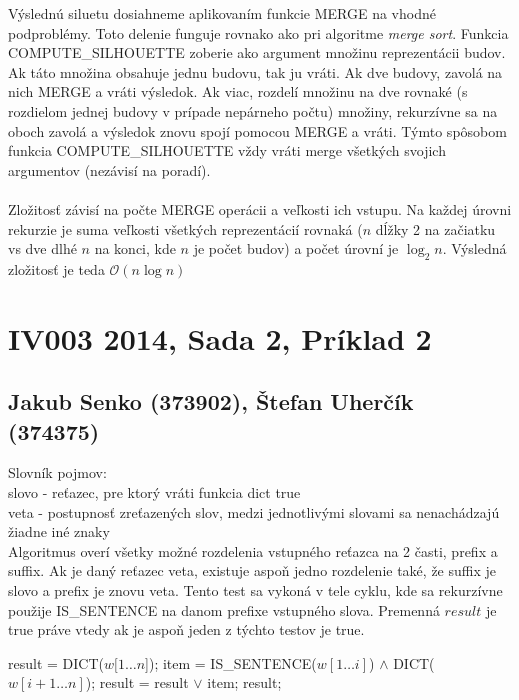 \documentclass[paper=a4, fontsize=11pt]{scrartcl} %
\numberwithin{equation}{section} %
\numberwithin{figure}{section} %
\numberwithin{table}{section} %
\begin{document}
Výslednú siluetu dosiahneme aplikovaním funkcie MERGE na vhodné podproblémy. Toto delenie funguje rovnako ako pri algoritme {\em merge sort}. Funkcia COMPUTE\_SILHOUETTE zoberie ako argument množinu reprezentácii budov. Ak táto množina obsahuje jednu budovu, tak ju vráti. Ak dve budovy, zavolá na nich MERGE a vráti výsledok. Ak viac, rozdelí množinu na dve rovnaké (s rozdielom jednej budovy v prípade nepárneho počtu) množiny, rekurzívne sa na oboch zavolá a výsledok znovu spojí pomocou MERGE a vráti. Týmto spôsobom funkcia COMPUTE\_SILHOUETTE vždy vráti merge všetkých svojich argumentov (nezávisí na poradí). \\
\\
Zložitosť závisí na počte MERGE operácii a veľkosti ich vstupu. Na každej úrovni rekurzie je suma veľkosti všetkých reprezentácií rovnaká ($n$ dĺžky 2 na začiatku vs dve dlhé $n$ na konci, kde $n$ je počet budov) a počet úrovní je $\log_2 n$. Výsledná zložitosť je teda $\mathcal{O}(n \log n)$

\pagebreak


\section*{IV003 2014, Sada 2, Príklad 2}
\subsection*{Jakub Senko (373902), Štefan Uherčík (374375)}

Slovník pojmov: \ \\
slovo - reťazec, pre ktorý vráti funkcia dict true \ \\
veta - postupnosť zreťazených slov, medzi jednotlivými slovami sa nenachádzajú žiadne iné znaky \ \\

Algoritmus overí všetky možné rozdelenia vstupného reťazca na 2 časti, prefix a suffix.
Ak je daný reťazec veta, existuje aspoň jedno rozdelenie také, že suffix je slovo a prefix je znovu veta.
Tento test sa vykoná v tele cyklu, kde sa rekurzívne použije IS\_SENTENCE na danom prefixe vstupného slova.
Premenná $result$ je true práve vtedy ak je aspoň jeden z týchto testov je true. \ \\

\begin{algorithmic}[1]
        \State result = DICT($w[1 \dots n$]);
        	\State item = IS\_SENTENCE($w[1 \dots i]$) $\wedge$ DICT($w[i + 1 \dots n]$);
		\State result = result $\vee$ item;
        \EndFor
        \State \Return result;
    \EndFunction
\end{algorithmic}
\ \\
\end{document}
